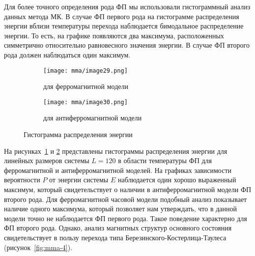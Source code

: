 Для более точного определения рода ФП мы использовали гистограммный анализ данных метода МК. В случае ФП первого рода на гистограмме распределения энергии вблизи температуры перехода наблюдается бимодальное распределение энергии. То есть, на графике появляются два максимума, расположенных симметрично относительно равновесного значения энергии. В случае ФП второго рода должен наблюдаться один максимум.

\begin{figure}[ht]
    \centering
    \begin{subfigure}{0.45\textwidth}
        \texttt{[image: mma/image29.png]}
        \caption{для ферромагнитной модели}
        \label{fig:mma-7a}
    \end{subfigure}
    \begin{subfigure}{0.45\textwidth}
        \texttt{[image: mma/image30.png]}
        \caption{для антиферромагнитной модели}
        \label{fig:mma-7b}
    \end{subfigure}
    \caption{Гистограмма распределения энергии}
    \label{fig:mma-7}
\end{figure}

На рисунках~\ref{fig:mma-7a} и \ref{fig:mma-7b} представлены гистограммы распределения энергии для линейных размеров системы $L =120$ в области температуры ФП для ферромагнитной и антиферромагнитной моделей. На графиках зависимости вероятности $P$ от энергии системы $E$ наблюдается один хорошо выраженный максимум, который свидетельствует о наличии в антиферромагнитной модели ФП второго рода. Для ферромагнитной часовой модели подобный анализ показывает наличие одного максимума, который позволяет нам утверждать, что в данной модели точно не наблюдается ФП первого рода. Такое поведение характерно для ФП второго рода. Однако, анализ магнитных структур основного состояния свидетельствует в пользу перехода типа Березинского-Костерлица-Таулеса (рисунок~\ref{fig:mma-4}). 



